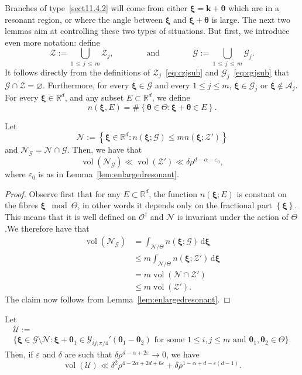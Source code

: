 \documentclass[AHL,Unicode,longabstracts,published]{cedram}
\DeclareMathOperator{\vol}{vol}
\newcommand{\de}{\, \mathrm{d}}
\newcommand{\R}{\mathbb R}
\newcommand{\CA}{\mathcal{A}}
\newcommand{\CG}{\mathcal{G}}
\newcommand{\CN}{\mathcal{N}}
\newcommand{\CO}{\mathcal{O}}
\newcommand{\CU}{\mathcal{U}}
\newcommand{\CY}{\mathcal{Y}}
\newcommand{\CZ}{\mathcal{Z}}
\newcommand{\btheta}{\boldsymbol \theta}
\newcommand{\bxi}{\boldsymbol \xi}
\newcommand{\bk}{\mathbf k}
\newcommand{\eps}{\varepsilon}
\newcommand{\set}[1]{\left\{ #1 \right\}}
\begin{document}
Branches of type~\eqref{sect11.4.2} will come from either $\bxi = \bk + \btheta$ which are in a resonant region, or where the angle between $\bxi$ and $\bxi + \btheta$ is large. The next two lemmas aim at controlling these two types of situations. But first, we introduce even more notation: define
\begin{equation}
\CZ := \bigcup_{1\,\le\,j\,\le\,m} \CZ_j, \qquad \qquad \text{and} \qquad \qquad
\CG := \bigcup_{1\,\le\,j\,\le\,m} \CG_j.
\end{equation}
It follows directly from the definitions of $\CZ_j$~\eqref{eq:czjsub} and $\CG_j$~\eqref{eq:cgjsub} that $\CG \cap \CZ = \varnothing$. Furthermore, for every $\bxi \in \CG$ and every $1 \le j \le m$, $\bxi \in \CG_j$ or $\bxi \not \in
\CA_j$. For every $\bxi \in \R^d$, and any subset $E \subset \R^d$, we define
\begin{equation}
n(\bxi,E) = \#\set{\btheta \in \Theta : \bxi + \btheta \in E}.
\end{equation}
\begin{lemm}\label{lem:numinter}
Let
\begin{equation}
\CN := \set{\bxi \in \R^d : n(\bxi;\CG) \le m n(\bxi;\CZ')}
\end{equation}
and $\CN_\CG = \CN \cap \CG$. Then, we have that
\begin{equation}
\vol(\CN_\CG) \ll \vol(\CZ') \ll
\delta\rho^{d - \alpha - \eps_0},
\end{equation}
where $\eps_0$ is as in Lemma~\ref{lem:enlargedresonant}.
\end{lemm}
\begin{proof}
Observe first that for any $E \subset \R^d$, the function $n(\bxi;E)$ is constant on the fibres $\bxi \mod \Theta$, in other words it depends only on the fractional part $\set \bxi$. This means that it is well defined on $\CO^\dagger$ and $\CN$ is invariant under the action of $\Theta$.\linebreak We therefore have that
\begin{align}
\vol(\CN_\CG) &= \int_{\CN/\Theta} n(\bxi;\CG) \de \bxi \\
&\le m \int_{\CN/\Theta} n(\bxi;\CZ') \de \bxi \\
& = m \vol(\CN \cap \CZ') \\
&\le m \vol(\CZ').
\end{align}
The claim now follows from Lemma~\ref{lem:enlargedresonant}.
\end{proof}

\begin{lemm}\label{lem:goodcrossings}
Let
\begin{multline}\label{eq:CU}
\CU :=\\
\big\{\bxi \in \CG \setminus \CN : \bxi + \btheta_1 \in
\CY_{ij,\pi/4}'(\btheta_1 - \btheta_2) \text{ for some } 1 \le i,j \le m
\text{ and } \btheta_1,\btheta_2 \in \Theta\big\}.
\end{multline}
Then, if $\eps$ and $\delta$ are such that $\delta \rho^{d - \alpha + 2 \eps} \to 0$, we have
\begin{equation}
\vol(\CU) \ll \delta^2 \rho^{4 - 2 \alpha + 2 d + 6\eps} + \delta \rho^{1 - \alpha + d - \eps(d-1)}.
\end{equation}
\end{lemm}
\end{document}
